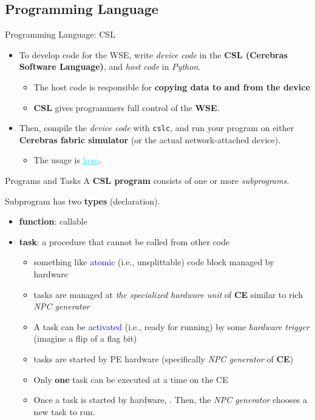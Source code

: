 \documentclass[dvipdfmx, 11pt, aspectratio=169]{beamer}   %
\newcommand{\ulhref}[2]{\href{#1}{\textcolor{cyan}{\uline{#2}}}}
\begin{document}
\subsection{Programming Language}
\begin{frame}[fragile]{Programming Language: CSL}
\begin{itemize}
    \item To develop code for the WSE, write \textit{device code} in the \textbf{CSL (Cerebras Software Language)}, and \textit{host code} in \textit{Python}.
    \begin{itemize}
        \item The host code is responsible for \textbf{copying data to and from the device}
        \item \textbf{CSL} gives programmers full control of the \textbf{WSE}.
    \end{itemize}
    \item Then, compile the \textit{device code} with \lstinline|cslc|, and run your program on either \textbf{Cerebras fabric simulator} (or the actual network-attached device).
    \begin{itemize}
        \item The usage is \ulhref{https://sdk.cerebras.net/csl/csl-compiler}{here}.
    \end{itemize}
\end{itemize}
\end{frame}
\begin{frame}{Programs and Tasks}
A \textbf{CSL program} consists of one or more \textit{subprograms}.

Subprogram has two \textbf{types} (declaration).
\begin{itemize}
    \item \textbf{function}: callable
    \item \textbf{task}: a procedure that cannot be called from other code
    \begin{itemize}
        \item something like \textcolor{blue}{atomic} (i.e., unsplittable) code block managed by hardware
        \item tasks are managed at \textit{the specialized hardware unit} of \textbf{CE} similar to rich \textit{NPC generator}
        \item A task can be \textcolor{blue}{activated} (i.e., ready for running) by some \textit{hardware trigger} (imagine a flip of a flag bit)
        \item tasks are started by PE hardware (specifically \textit{NPC generator} of \textbf{CE})
        \item Only \textbf{one} task can be executed at a time on the CE
        \item Once a task is started by hardware, . Then, the \textit{NPC generator} chooses a new task to run.
    \end{itemize}
\end{itemize}
\end{frame}
\end{document}
